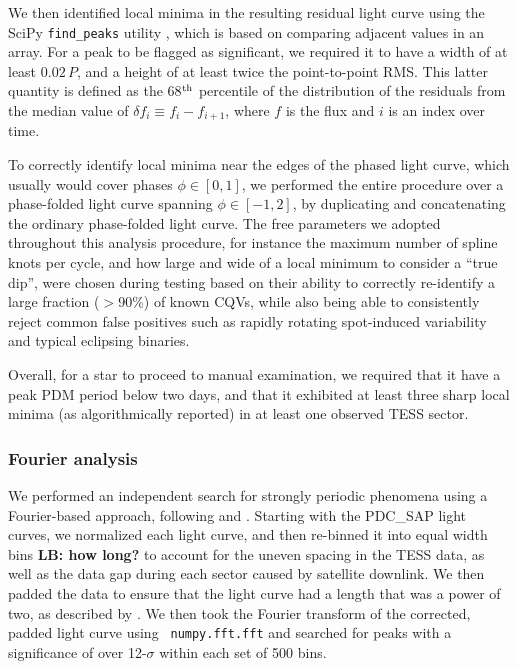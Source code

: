\documentclass[11pt,twocolumn,tighten]{aastex63}
\begin{document}
We then identified local minima in the resulting residual light curve
using the SciPy \texttt{find\_peaks} utility
\citep{2020NatMe..17..261V}, which is based on comparing adjacent
values in an array.  For a peak to be flagged as significant, we
required it to have a width of at least $0.02\,P$, and a height of at
least twice the point-to-point RMS.  This latter quantity is defined
as the 68$^{\rm th}$ percentile of the distribution of the residuals
from the median value of $\delta f_i \equiv f_i - f_{i+1}$, where $f$
is the flux and $i$ is an index over time.

To correctly identify local minima near the edges of the phased light
curve, which usually would cover phases $\phi \in [ 0,1 ]$, we
performed the entire procedure over a phase-folded light curve
spanning $\phi \in [-1,2 ]$, by duplicating and concatenating the
ordinary phase-folded light curve.  The free parameters we adopted
throughout this analysis procedure, for instance the maximum number of
spline knots per cycle, and how large and wide of a local minimum to
consider a ``true dip'', were chosen during testing based on their
ability to correctly re-identify a large fraction ($>$90\%) of known
CQVs, while also being able to consistently reject common false
positives such as rapidly rotating spot-induced variability and
typical eclipsing binaries.

Overall, for a star to proceed to manual examination, we required that
it have a peak PDM period below two days, and that it exhibited at
least three sharp local minima (as algorithmically reported) in at
least one observed TESS sector.



\subsubsection{Fourier analysis}
\label{subsec:fourier}

We performed an independent search for strongly periodic phenomena
using a Fourier-based approach, following \citet{2019ApJ...876..127Z}
and \citet[][their Section~1.3]{2023MNRAS.524.4220P}.  Starting with
the PDC\_SAP light curves, we normalized each light curve, and then
re-binned it into equal width bins {\bf LB: how long?} to account for
the uneven spacing in the TESS data, as well as the data gap during
each sector caused by satellite downlink.  We then padded the data to
ensure that the light curve had a length that was a power of two, as
described by \citeauthor{2019ApJ...876..127Z}.  We then took the
Fourier transform of the corrected, padded light curve using {\tt
numpy.fft.fft} and searched for peaks with a significance of over
12-$\sigma$ within each set of 500 bins. 
\end{document}

